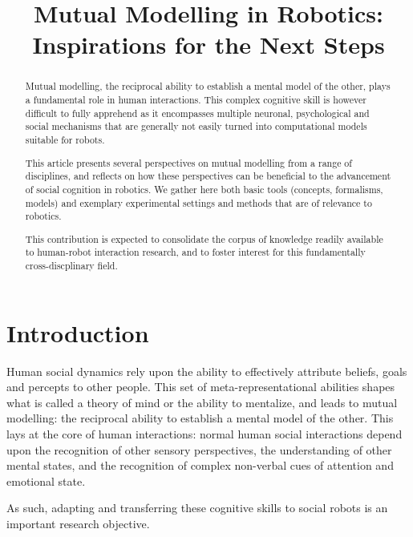 \documentclass{sig-alternate}
\title{\LARGE \bf
Mutual Modelling in Robotics: \\Inspirations for the Next Steps
}
\begin{document}
\maketitle

\begin{abstract}

Mutual modelling, the reciprocal ability to establish a mental model of the
other, plays a fundamental role in human interactions. This complex cognitive
skill is however difficult to fully apprehend as it encompasses multiple
neuronal, psychological and social mechanisms that are generally not easily
turned into computational models suitable for robots.

This article presents several perspectives on mutual modelling from a range of
disciplines, and reflects on how these perspectives can be beneficial to the
advancement of social cognition in robotics. We gather here both basic tools
(concepts, formalisms, models) and exemplary experimental settings and methods
that are of relevance to robotics.

This contribution is expected to consolidate the corpus of knowledge readily
available to human-robot interaction research, and to foster interest for this
fundamentally cross-discplinary field.

\end{abstract}


\section{Introduction}

Human social dynamics rely upon the ability to effectively attribute beliefs,
goals and percepts to other people. This set of meta-representational abilities
shapes what is called a theory of mind or the ability to mentalize, and leads to
mutual modelling: the reciprocal ability to establish a mental model of the
other. This lays at the core of human interactions: normal human social
interactions depend upon the recognition of other sensory perspectives, the
understanding of other mental states, and the recognition of complex non-verbal
cues of attention and emotional state.

As such, adapting and transferring these cognitive skills to social robots is an important
research objective.
\end{document}
